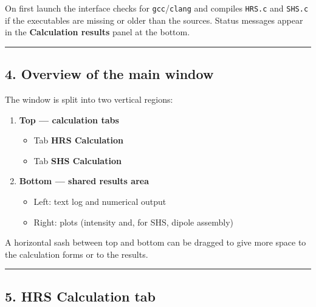On first launch the interface checks for \texttt{gcc}/\texttt{clang} and
compiles \texttt{HRS.c} and \texttt{SHS.c} if the executables are
missing or older than the sources. Status messages appear in the
\textbf{Calculation results} panel at the bottom.

\begin{center}\rule{0.5\linewidth}{0.5pt}\end{center}

\hypertarget{overview-of-the-main-window}{%
\subsection{4. Overview of the main
window}\label{overview-of-the-main-window}}

The window is split into two vertical regions:

\begin{enumerate}
\def\labelenumi{\arabic{enumi}.}
\tightlist
\item
  \textbf{Top --- calculation tabs}

  \begin{itemize}
  \tightlist
  \item
    Tab \textbf{HRS Calculation}\\
  \item
    Tab \textbf{SHS Calculation}
  \end{itemize}
\item
  \textbf{Bottom --- shared results area}

  \begin{itemize}
  \tightlist
  \item
    Left: text log and numerical output\\
  \item
    Right: plots (intensity and, for SHS, dipole assembly)
  \end{itemize}
\end{enumerate}

A horizontal sash between top and bottom can be dragged to give more
space to the calculation forms or to the results.

\begin{center}\rule{0.5\linewidth}{0.5pt}\end{center}

\hypertarget{hrs-calculation-tab}{%
\subsection{5. HRS Calculation tab}\label{hrs-calculation-tab}}

